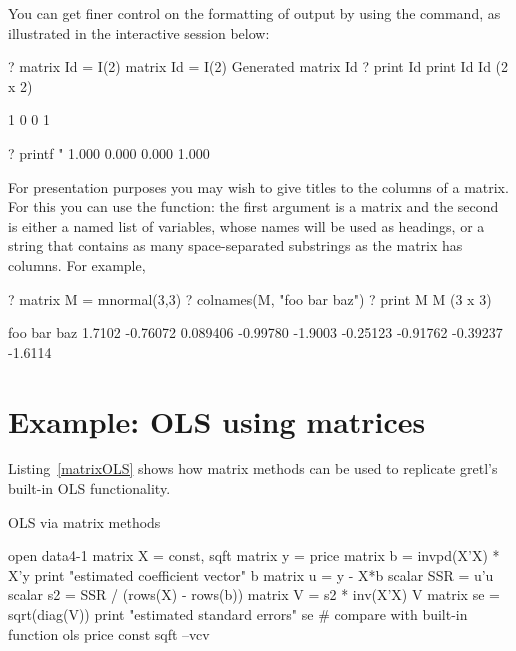 You can get finer control on the formatting of output by using the
 command, as illustrated in the interactive session below:
%
\begin{code}
? matrix Id = I(2)
 matrix Id = I(2)
Generated matrix Id
? print Id
 print Id
Id (2 x 2)

  1   0 
  0   1 

? printf "%
     1.000     0.000
     0.000     1.000
\end{code}

For presentation purposes you may wish to give titles to the columns
of a matrix.  For this you can use the  function: the first
argument is a matrix and the second is either a named list of variables,
whose names will be used as headings, or a string that contains as many
space-separated substrings as the matrix has columns.  For example,
%
\begin{code}
? matrix M = mnormal(3,3)
? colnames(M, "foo bar baz")
? print M
M (3 x 3)

         foo          bar          baz 
      1.7102     -0.76072     0.089406 
    -0.99780      -1.9003     -0.25123 
    -0.91762     -0.39237      -1.6114
\end{code}


\section{Example: OLS using matrices}
\label{matrix-example}

Listing~\ref{matrixOLS} shows how matrix methods can be used to
replicate gretl's built-in OLS functionality.

\begin{script}[htbp]
  \caption{OLS via matrix methods}
  \label{matrixOLS}
\begin{scode}
open data4-1
matrix X = { const, sqft }
matrix y = { price }
matrix b = invpd(X'X) * X'y
print "estimated coefficient vector"
b
matrix u = y - X*b
scalar SSR = u'u
scalar s2 = SSR / (rows(X) - rows(b))
matrix V = s2 * inv(X'X)
V
matrix se = sqrt(diag(V))
print "estimated standard errors"
se
# compare with built-in function
ols price const sqft --vcv
\end{scode}
\end{script}

